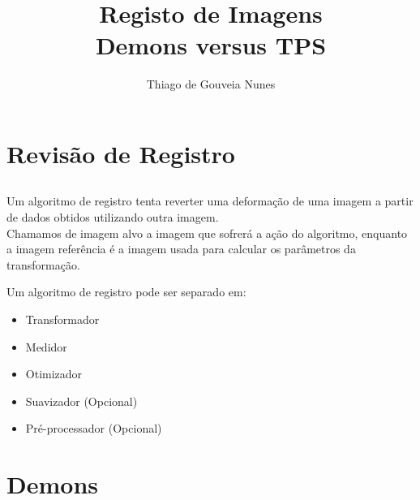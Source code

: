 \documentclass[t]{beamer}
\author{Thiago de Gouveia Nunes}
\title{Registo de Imagens\\ Demons versus TPS}
\institute{IME - USP}
\begin{document}
\graphicspath{{images/}}
\frame{\titlepage}

\section{Revisão de Registro}
\subsection{}

\begin{frame}
    Um algoritmo de registro tenta reverter uma deformação de uma imagem a partir de dados obtidos utilizando outra imagem. \\
    Chamamos de imagem alvo a imagem que sofrerá a ação do algoritmo, enquanto a imagem referência é a imagem usada para calcular os parâmetros da transformação.
\end{frame}



\begin{frame}
    Um algoritmo de registro pode ser separado em:
    \begin{itemize}
        \item Transformador
        \item Medidor
        \item Otimizador
        \item Suavizador (Opcional)
        \item Pré-processador (Opcional)
    \end{itemize}
\end{frame}

\section{Demons}
\end{document}
